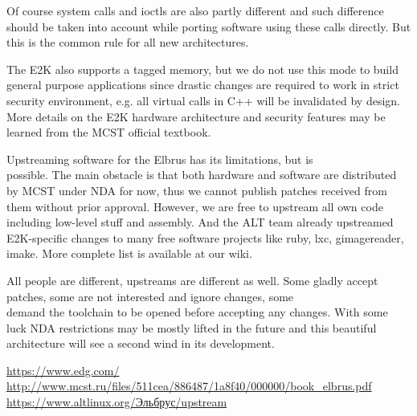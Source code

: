 \documentclass[10pt, a5paper]{article}
\begin{document}
Of course system calls and ioctls are also partly different and such difference should be taken into account while porting software using these calls directly. But this is the common rule for all new architectures.

The E2K also supports a tagged memory, but we do not use this mode to build general purpose applications since drastic changes are required to work in strict security environment, e.g. all virtual calls in C++ will be invalidated by design. More details on the E2K hardware architecture and security features may be learned from the MCST official textbook\cite{Savchenko2}.

Upstreaming software for the Elbrus has its limitations, but is \\possible. The main obstacle is that both hardware and software are distributed by MCST under NDA for now, thus we cannot publish patches received from them without prior approval. However, we are free to upstream all own code including low-level stuff and assembly. And the ALT team already upstreamed E2K-specific changes to many free software projects like ruby, lxc, gimagereader, imake. More complete list is available at our wiki\cite{Savchenko3}.

All people are different, upstreams are different as well. Some gladly accept patches, some are not interested and ignore changes, some \\demand the toolchain to be opened before accepting any changes. With some luck NDA restrictions may be mostly lifted in the future and this beautiful architecture will see a second wind in its development.

\begin{thebibliography}{99}
\url{https://www.edg.com/}
\url{http://www.mcst.ru/files/511cea/886487/1a8f40/000000/book\_elbrus.pdf}
\url{https://www.altlinux.org/Эльбрус/upstream}
\end{thebibliography}
\end{document}
